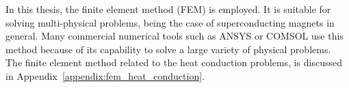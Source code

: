 In this thesis, the finite element method (FEM) is employed. It is suitable for solving multi-physical problems, being the case of superconducting magnets in general. Many commercial numerical tools such as ANSYS or COMSOL use this method because of its capability to solve a large variety of physical problems. The finite element method related to the heat conduction problems, is discussed in Appendix~\ref{appendix:fem_heat_conduction}.

